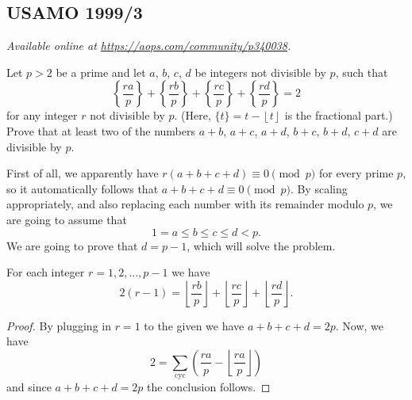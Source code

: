 \documentclass[11pt]{scrartcl}
\begin{document}
\subsection{USAMO 1999/3}
\textsl{Available online at \url{https://aops.com/community/p340038}.}
\begin{mdframed}[style=mdpurplebox,frametitle={Problem statement}]
Let $p > 2$ be a prime and let $a$, $b$, $c$, $d$ be integers not divisible by $p$,
such that
\[ \left\{ \dfrac{ra}{p} \right\} + \left\{ \dfrac{rb}{p} \right\}
  + \left\{ \dfrac{rc}{p} \right\} + \left\{ \dfrac{rd}{p} \right\} = 2  \]
for any integer $r$ not divisible by $p$.
(Here, $\{t\} = t - \left\lfloor t \right\rfloor$ is the fractional part.)
Prove that at least two of the numbers
$a+b$, $a+c$, $a+d$, $b+c$, $b+d$, $c+d$ are divisible by $p$.
\end{mdframed}
First of all, we apparently have $r(a+b+c+d) \equiv 0 \pmod p$
for every prime $p$, so it automatically follows that $a+b+c+d \equiv 0 \pmod p$.
By scaling appropriately, and also replacing each number with its remainder modulo $p$,
we are going to assume that
\[ 1 = a \le b \le c \le d < p. \]
We are going to prove that $d = p-1$, which will solve the problem.

\begin{claim*}
  For each integer $r = 1, 2, \dots, p-1$ we have
  \[ 2(r-1) = \left\lfloor \frac{rb}{p} \right\rfloor
    + \left\lfloor \frac{rc}{p} \right\rfloor
    + \left\lfloor \frac{rd}{p} \right\rfloor. \]
\end{claim*}
\begin{proof}
  By plugging in $r=1$ to the given we have $a+b+c+d=2p$.
  Now, we have
  \[ 2 = \sum_{\text{cyc}} \left( \frac{ra}{p}
    - \left\lfloor \frac{ra}{p} \right\rfloor \right) \]
  and since $a+b+c+d=2p$ the conclusion follows.
\end{proof}

\end{document}
